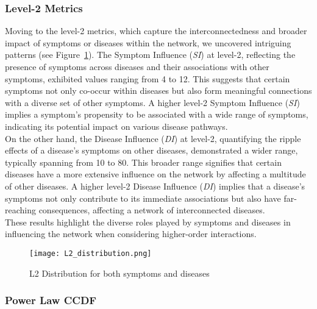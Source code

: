 \subsubsection*{Level-2 Metrics}
Moving to the level-2 metrics, which capture the interconnectedness and broader impact of symptoms or diseases within the network,
we uncovered intriguing patterns (see Figure~\ref{fig:l2_distribution}).
The Symptom Influence (\textit{SI}) at level-2, reflecting the presence of symptoms across diseases and their associations with other symptoms,
exhibited values ranging from 4 to 12.
This suggests that certain symptoms not only co-occur within diseases but also form meaningful connections with a diverse set of other symptoms.
A higher level-2 Symptom Influence (\textit{SI}) implies a symptom's propensity to be associated with a wide range of symptoms,
indicating its potential impact on various disease pathways.\\
On the other hand, the Disease Influence (\textit{DI}) at level-2, quantifying the ripple effects of a disease's symptoms on other diseases,
demonstrated a wider range, typically spanning from 10 to 80.
This broader range signifies that certain diseases have a more extensive influence on the network by affecting a multitude of other diseases.
A higher level-2 Disease Influence (\textit{DI}) implies that a disease's symptoms not only contribute to its immediate associations
but also have far-reaching consequences, affecting a network of interconnected diseases.\\
These results highlight the diverse roles played by symptoms and diseases in influencing the network when considering higher-order interactions.


\begin{figure}[H]
    \centering
    \texttt{[image: L2\_distribution.png]}
    \caption{L2 Distribution for both symptoms and diseases}
    \label{fig:l2_distribution}
\end{figure}
\subsubsection*{Power Law CCDF}


